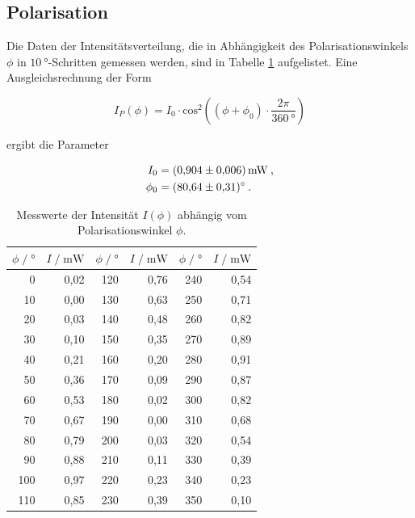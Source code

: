 \subsection{Polarisation}

Die Daten der Intensitätsverteilung, die in Abhängigkeit des Polarisationswinkels $\phi$ in 
$\SI{10}{\degree}$-Schritten gemessen werden, sind in Tabelle \ref{tab:pol} aufgelistet.
Eine Ausgleichsrechnung der Form 

\vspace{-15pt}
\begin{equation}
    I_P(\phi) = I_0 \cdot \text{cos}^2 \left((\phi  + \phi_0)\cdot \frac{2\pi}{\SI{360}{\degree}}\right)
\end{equation}

ergibt die Parameter

\vspace{-15pt}
\begin{align*}
    I_0 &= \SI{0.904 +- 0.006}{\milli\watt}\: , \\ 
    \phi_0 &= \SI{80.64 +- 0.31}{\degree} \: .
\end{align*}

\begin{table}[H]
    \centering
    \footnotesize
    \caption{Messwerte der Intensität $I(\phi)$ abhängig vom Polarisationswinkel $\phi$.}
    \label{tab:pol}
    \begin{tabular}{r r | r r | r r}
    \toprule
    $\phi \;/\; \si{\degree}$ & $I \;/\; \si{\milli\watt}$ & $\phi \;/\; \si{\degree}$ & $I \;/\; \si{\milli\watt}$
    & $\phi \;/\; \si{\degree}$ & $I \;/\; \si{\milli\watt}$ \\
    \midrule
         0 & 0,02 & 120 & 0,76 & 240 & 0,54 \\
        10 & 0,00 & 130 & 0,63 & 250 & 0,71 \\
        20 & 0,03 & 140 & 0,48 & 260 & 0,82 \\
        30 & 0,10 & 150 & 0,35 & 270 & 0,89 \\
        40 & 0,21 & 160 & 0,20 & 280 & 0,91 \\
        50 & 0,36 & 170 & 0,09 & 290 & 0,87 \\
        60 & 0,53 & 180 & 0,02 & 300 & 0,82 \\
        70 & 0,67 & 190 & 0,00 & 310 & 0,68 \\
        80 & 0,79 & 200 & 0,03 & 320 & 0,54 \\
        90 & 0,88 & 210 & 0,11 & 330 & 0,39 \\
       100 & 0,97 & 220 & 0,23 & 340 & 0,23 \\
       110 & 0,85 & 230 & 0,39 & 350 & 0,10 \\
    \bottomrule
    \end{tabular}
\end{table}

